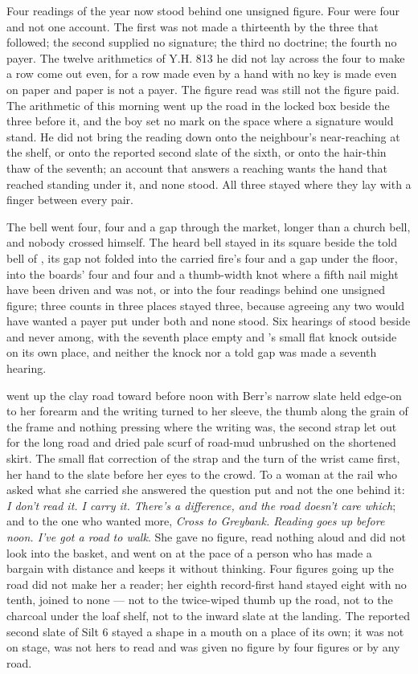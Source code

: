 Four readings of the year now stood behind one unsigned figure. Four were four and not one account. The first was not made a thirteenth by the three that followed; the second supplied no signature; the third no doctrine; the fourth no payer. The twelve arithmetics of Y.H. 813 he did not lay across the four to make a row come out even, for a row made even by a hand with no key is made even on paper and paper is not a payer. The figure read was still not the figure paid. The arithmetic of this morning went up the road in the locked box beside the three before it, and the boy set no mark on the space where a signature would stand. He did not bring the reading down onto the neighbour's near-reaching at the shelf, or onto the reported second slate of the sixth, or onto the hair-thin thaw of the seventh; an account that answers a reaching wants the hand that reached standing under it, and none stood. All three stayed where they lay with a finger between every pair.

\scenebreak

The bell went four, four and a gap through the market, longer than a church bell, and nobody crossed himself. The heard bell stayed in its square beside the told bell of , its gap not folded into the carried fire's four and a gap under the floor, into the boards' four and four and a thumb-width knot where a fifth nail might have been driven and was not, or into the four readings behind one unsigned figure; three counts in three places stayed three, because agreeing any two would have wanted a payer put under both and none stood. Six hearings of  stood beside and never among, with the seventh place empty and 's small flat knock outside on its own place, and neither the knock nor a told gap was made a seventh hearing.

 went up the clay road toward  before noon with Berr's narrow slate held edge-on to her forearm and the writing turned to her sleeve, the thumb along the grain of the frame and nothing pressing where the writing was, the second strap let out for the long road and dried pale scurf of road-mud unbrushed on the shortened skirt. The small flat correction of the strap and the turn of the wrist came first, her hand to the slate before her eyes to the crowd. To a woman at the rail who asked what she carried she answered the question put and not the one behind it: \emph{I don't read it. I carry it. There's a difference, and the road doesn't care which}; and to the one who wanted more, \emph{Cross to Greybank. Reading goes up before noon. I've got a road to walk}. She gave no figure, read nothing aloud and did not look into the basket, and went on at the pace of a person who has made a bargain with distance and keeps it without thinking. Four figures going up the road did not make her a reader; her eighth record-first hand stayed eight with no tenth, joined to none --- not to the twice-wiped thumb up the road, not to the charcoal under the loaf shelf, not to the inward slate at the landing. The reported second slate of Silt 6 stayed a shape in a mouth on a place of its own; it was not on stage, was not hers to read and was given no figure by four figures or by any road.

